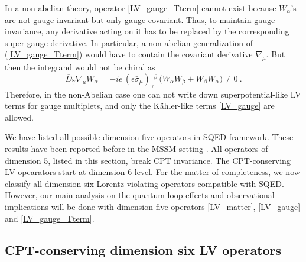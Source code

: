 \documentclass[12pt]{revtex4}
\begin{document}
In a non-abelian theory, operator 
\eqref{LV_gauge_Tterm} cannot exist because 
$W_\alpha$'s are not gauge invariant but only gauge covariant.
Thus, to maintain gauge invariance, any derivative acting on it has to
be replaced by the corresponding super gauge derivative. 
In particular, a non-abelian generalization of 
 (\ref{LV_gauge_Tterm}) would have to contain the covariant
derivative $\nabla_\mu$.  But then the integrand would not be chiral as 
\begin{equation}
\overline{D}_{\dot\gamma} \nabla_\mu W_\alpha = 
-i e\, (\epsilon \bar\sigma_\mu)_{\dot\gamma}{}^\beta\, 
\Big( W_\alpha W_\beta + W_\beta W_\alpha \Big) \neq 0~. 
\end{equation} 
Therefore, in the non-Abelian case one can not write down
superpotential-like LV terms for gauge multiplets, and only 
the K\"ahler-like terms \eqref{LV_gauge} are allowed. 

We have listed all possible dimension five operators in SQED framework.
These results have been reported before in the MSSM setting \cite{GrootNibbelink:2004za}.
All operators of dimension 5, listed in this section, break CPT invariance. 
The CPT-conserving LV opearators start at dimension 6 level. 
For the matter of completeness, we now classify all dimension 
six Lorentz-violating operators compatible with SQED. 
However, our main analysis on the quantum loop effects and observational 
implications will be done with dimension five
operators \eqref{LV_matter}, \eqref{LV_gauge} and \eqref{LV_gauge_Tterm}.


\subsection{CPT-conserving dimension six LV operators}
\label{Dim6}


\end{document}
